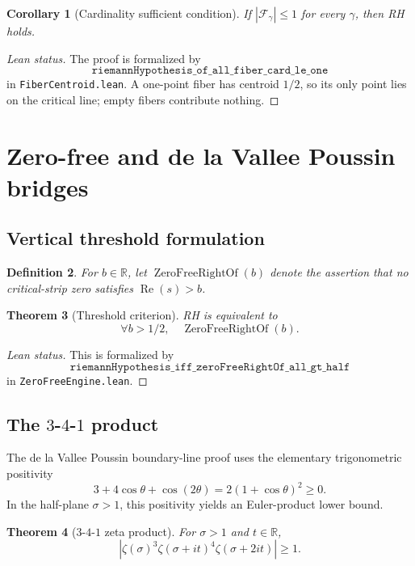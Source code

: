 \documentclass[11pt]{amsart}
\newtheorem{theorem}{Theorem}[section]
\newtheorem{corollary}[theorem]{Corollary}
\newtheorem{definition}[theorem]{Definition}
\newcommand{\R}{\mathbb{R}}
\newcommand{\zetaR}{\zeta}
\newcommand{\re}{\operatorname{Re}}
\newcommand{\fiber}{\mathcal{F}}
\newcommand{\lean}[1]{\texttt{#1}}
\begin{document}
\begin{corollary}[Cardinality sufficient condition]
If \(|\fiber_\gamma|\leq 1\) for every \(\gamma\), then RH holds.
\end{corollary}

\begin{proof}[Lean status]
The proof is formalized by
\[
  \lean{riemannHypothesis\_of\_all\_fiber\_card\_le\_one}
\]
in \lean{FiberCentroid.lean}.  A one-point fiber has centroid \(1/2\), so its
only point lies on the critical line; empty fibers contribute nothing.
\end{proof}

\section{Zero-free and de la Vallee Poussin bridges}
\label{sec:zero-free}

\subsection{Vertical threshold formulation}

\begin{definition}
For \(b\in\R\), let \(\operatorname{ZeroFreeRightOf}(b)\) denote the assertion
that no critical-strip zero satisfies \(\re(s)>b\).
\end{definition}

\begin{theorem}[Threshold criterion]
RH is equivalent to
\[
  \forall b>1/2,\quad \operatorname{ZeroFreeRightOf}(b).
\]
\end{theorem}

\begin{proof}[Lean status]
This is formalized by
\[
  \lean{riemannHypothesis\_iff\_zeroFreeRightOf\_all\_gt\_half}
\]
in \lean{ZeroFreeEngine.lean}.
\end{proof}

\subsection{The \(3\)-\(4\)-\(1\) product}

The de la Vallee Poussin boundary-line proof uses the elementary trigonometric
positivity
\[
  3+4\cos\theta+\cos(2\theta)=2(1+\cos\theta)^2\geq 0.
\]
In the half-plane \(\sigma>1\), this positivity yields an Euler-product lower
bound.

\begin{theorem}[\(3\)-\(4\)-\(1\) zeta product]
For \(\sigma>1\) and \(t\in\R\),
\[
  \left|\zetaR(\sigma)^3
    \zetaR(\sigma+it)^4
    \zetaR(\sigma+2it)\right|\geq 1.
\]
\end{theorem}
\end{document}
